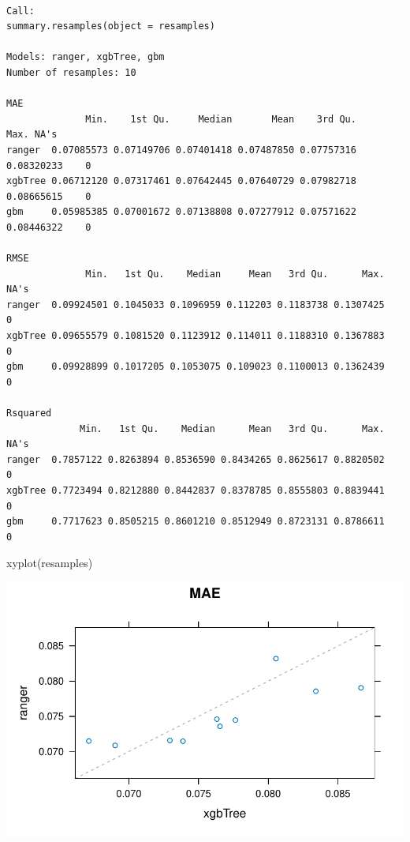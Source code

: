\documentclass[
  letterpaper,
  DIV=11,
  numbers=noendperiod]{scrartcl}
\newenvironment{Shaded}{\begin{snugshade}}{\end{snugshade}}
\newcommand{\FunctionTok}[1]{\textcolor[rgb]{0.28,0.35,0.67}{#1}}
\newcommand{\NormalTok}[1]{\textcolor[rgb]{0.00,0.23,0.31}{#1}}
\begin{document}
\begin{verbatim}

Call:
summary.resamples(object = resamples)

Models: ranger, xgbTree, gbm 
Number of resamples: 10 

MAE 
              Min.    1st Qu.     Median       Mean    3rd Qu.       Max. NA's
ranger  0.07085573 0.07149706 0.07401418 0.07487850 0.07757316 0.08320233    0
xgbTree 0.06712120 0.07317461 0.07642445 0.07640729 0.07982718 0.08665615    0
gbm     0.05985385 0.07001672 0.07138808 0.07277912 0.07571622 0.08446322    0

RMSE 
              Min.   1st Qu.    Median     Mean   3rd Qu.      Max. NA's
ranger  0.09924501 0.1045033 0.1096959 0.112203 0.1183738 0.1307425    0
xgbTree 0.09655579 0.1081520 0.1123912 0.114011 0.1188310 0.1367883    0
gbm     0.09928899 0.1017205 0.1053075 0.109023 0.1100013 0.1362439    0

Rsquared 
             Min.   1st Qu.    Median      Mean   3rd Qu.      Max. NA's
ranger  0.7857122 0.8263894 0.8536590 0.8434265 0.8625617 0.8820502    0
xgbTree 0.7723494 0.8212880 0.8442837 0.8378785 0.8555803 0.8839441    0
gbm     0.7717623 0.8505215 0.8601210 0.8512949 0.8723131 0.8786611    0
\end{verbatim}

\begin{Shaded}
\begin{Highlighting}[]
\FunctionTok{xyplot}\NormalTok{(resamples)}
\end{Highlighting}
\end{Shaded}

\includegraphics{MachineLearning_StaticPatterNN_Report_files/figure-pdf/final-models-comparison-1.pdf}
\end{document}
